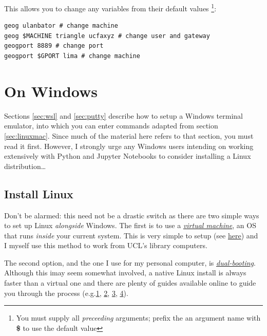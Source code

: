 \documentclass[a4paper]{article}
\begin{document}
This allows you to change any variables from their default values \footnote{You must supply all \emph{preceeding} arguments; prefix the an argument name with \textbf{\$} to use the default value}:

\begin{lstlisting}[caption={Examples of arguments to geography login/tunnel functions}, label={lst:gfuncsargseg}]
geog ulanbator # change machine
geog $MACHINE triangle ucfaxyz # change user and gateway
geogport 8889 # change port
geogport $GPORT lima # change machine
\end{lstlisting}

\section{On Windows}
\label{sec:windows}

Sections \ref{sec:wsl} and \ref{sec:putty} describe how to setup a Windows terminal emulator, into which you can enter commands adapted from section \ref{sec:linuxmac}.
Since much of the material here refers to that section, you must read it first.
However, I strongly urge any Windows users intending on working extensively with Python and Jupyter Notebooks to consider installing a Linux distribution\ldots

\subsection{Install Linux}
\label{sec:win2lnx}
Don't be alarmed: this need not be a drastic switch as there are two simple ways to set up Linux \emph{alongside} Windows.
The first is to use a \emph{\href{https://www.howtogeek.com/196060/beginner-geek-how-to-create-and-use-virtual-machines/}{virtual machine}}, an OS that runs \emph{inside} your current system.
This is very simple to setup (see \href{http://www.storagecraft.com/blog/the-dead-simple-guide-to-installing-a-linux-virtual-machine-on-windows/}{here}) and I myself use this method to work from UCL's library computers.

The second option, and the one I use for my personal computer, is \emph{\href{https://www.howtogeek.com/187789/dual-booting-explained-how-you-can-have-multiple-operating-systems-on-your-computer/}{dual-booting}}.
Although this imay seem somewhat involved, a native Linux install is always faster than a virtual one and there are plenty of guides available online to guide you through the process (e.g.\href{https://itsfoss.com/guide-install-linux-mint-16-dual-boot-windows/}{1}, \href{https://www.lifewire.com/ultimate-windows-7-ubuntu-linux-dual-boot-guide-2200.53}{2}, \href{https://www.howtogeek.com/214571/how-to-dual-boot-linux-on-your-pc/}{3}, \href{http://www.pcworld.com/article/2955460/operating-systems/dual-booting-linux-with-windows-what-you-need-to-know.html}{4}). 
\end{document}
